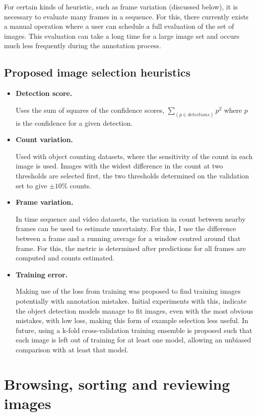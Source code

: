 For certain kinds of heuristic, such as frame variation (discussed below), it is necessary to evaluate many frames in a sequence. For this, there currently exists a manual operation where a user can schedule a full evaluation of the set of images. This evaluation can take a long time for a large image set and occurs much less frequently during the annotation process.


\subsection {Proposed image selection heuristics}
\begin{itemize}
\item {\bf Detection score. }

Uses the sum of squares of the confidence scores, $ \sum_(p \in detections){ p^2 } $ where $p$ is the confidence for a given detection. 

    \item {\bf Count variation. } \par
Used with object counting datasets, where the sensitivity of the count in each image is used. Images with the widest difference in the count at two thresholds are selected first, the two thresholds determined on the validation set to give $ \pm 10\% $ counts.
    \item {\bf Frame variation. }  \par
In time sequence and video datasets, the variation in count between nearby frames can be used to estimate uncertainty. For this, I use the difference between a frame and a running average for a window centred around that frame. For this, the metric is determined after predictions for all frames are computed and counts estimated.
    \item {\bf Training error. }  \par
Making use of the loss from training was proposed to find training images potentially with annotation mistakes. Initial experiments with this, indicate the object detection models manage to fit images, even with the most obvious mistakes, with low loss, making this form of example selection less useful. In future, using a k-fold cross-validation training ensemble is proposed such that each image is left out of training for at least one model, allowing an unbiased comparison with at least that model.
\end{itemize}


\section{Browsing, sorting and reviewing images}
\label{sec:browising}

